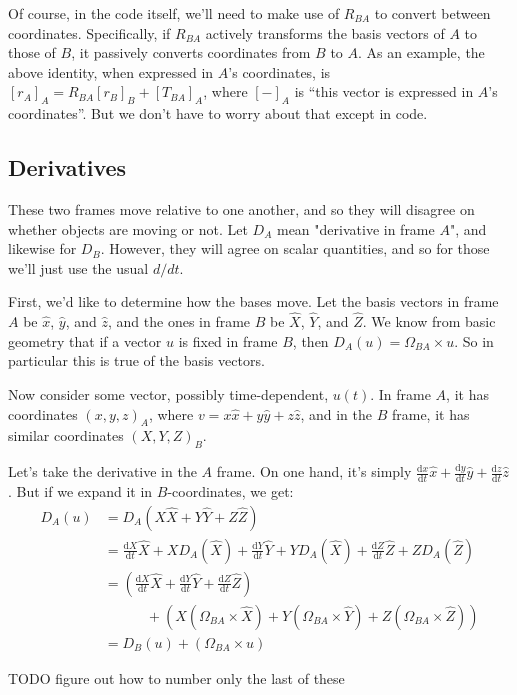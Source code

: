 \documentclass{article}
\newcommand{\dd}{\mathrm{d}}
\newcommand{\der}[2]{\frac{\dd #1}{\dd #2}}
\numberwithin{equation}{subsection}
\begin{document}
Of course, in the code itself, we'll need to make use of $R_{BA}$ to convert between coordinates. Specifically, if $R_{BA}$ actively transforms the basis vectors of $A$ to those of $B$, it passively converts coordinates from $B$ to $A$. As an example, the above identity, when expressed in $A$'s coordinates, is $[r_A]_A = R_{BA} [r_B]_B + [T_{BA}]_A$, where $[-]_A$ is ``this vector is expressed in $A$'s coordinates''. But we don't have to worry about that except in code.

\subsection{Derivatives}

These two frames move relative to one another, and so they will disagree on whether objects are moving or not. Let $D_A$ mean "derivative in frame $A$", and likewise for $D_B$. However, they will agree on scalar quantities, and so for those we'll just use the usual $d/dt$.

First, we'd like to determine how the bases move. Let the basis vectors in frame $A$ be $\hat x$, $\hat y$, and $\hat z$, and the ones in frame $B$ be $\hat X$, $\hat Y$, and $\hat Z$. We know from basic geometry that if a vector $u$ is fixed in frame $B$, then $D_A (u) = \Omega_{BA} \times u$. So in particular this is true of the basis vectors.

Now consider some vector, possibly time-dependent, $u(t)$. In frame $A$, it has coordinates $(x, y, z)_A$, where $v = x \hat x + y \hat y + z \hat z$, and in the $B$ frame, it has similar coordinates $(X, Y, Z)_B$.

Let's take the derivative in the $A$ frame. On one hand, it's simply $\der{x}{t} \hat x + \der{y}{t} \hat y + \der{z}{t} \hat z$. But if we expand it in $B$-coordinates, we get:
\begin{align*}
D_A (u) &= D_A (X \hat X + Y \hat Y + Z \hat Z) \\
&= \der{X}{t} \hat X + X D_A (\hat X) + \der{Y}{t} \hat Y + Y D_A (\hat X) + \der{Z}{t} \hat Z + Z D_A (\hat Z) \\
&= \left( \der{X}{t} \hat X + \der{Y}{t} \hat Y + \der{Z}{t} \hat Z \right) \\
&\qquad\quad + \left( X (\Omega_{BA} \times \hat X) + Y (\Omega_{BA} \times \hat Y) + Z (\Omega_{BA} \times \hat Z) \right) \\
&= D_B (u) + (\Omega_{BA} \times u)
\end{align*}

TODO figure out how to number only the last of these
\end{document}

